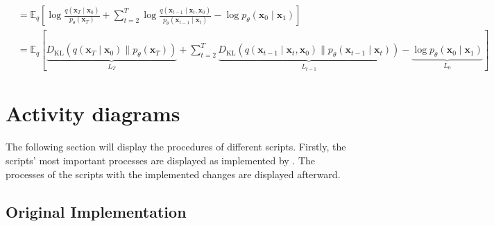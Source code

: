 \begin{subequations}
\begin{align}
	& =\mathbb{E}_q\left[\log \frac{q\left(\mathbf{x}_T \mid \mathbf{x}_0\right)}{p_\theta\left(\mathbf{x}_T\right)}+\sum_{t=2}^T \log \frac{q\left(\mathbf{x}_{t-1} \mid \mathbf{x}_t, \mathbf{x}_0\right)}{p_\theta\left(\mathbf{x}_{t-1} \mid \mathbf{x}_t\right)}-\log p_\theta\left(\mathbf{x}_0 \mid \mathbf{x}_1\right)\right] \\
	& =\mathbb{E}_q[\underbrace{D_{\mathrm{KL}}\left(q\left(\mathbf{x}_T \mid \mathbf{x}_0\right) \| p_\theta\left(\mathbf{x}_T\right)\right)}_{L_T}+\sum_{t=2}^T \underbrace{D_{\mathrm{KL}}\left(q\left(\mathbf{x}_{t-1} \mid \mathbf{x}_t, \mathbf{x}_0\right) \| p_\theta\left(\mathbf{x}_{t-1} \mid \mathbf{x}_t\right)\right)}_{L_{t-1}}-\underbrace{\log p_\theta\left(\mathbf{x}_0 \mid \mathbf{x}_1\right)}_{L_0}]
	\end{align}
\end{subequations}
\endgroup

\newpage


\section{Activity diagrams}
\label{A:activity_diagrams}

The following section will display the procedures of different scripts.
Firstly, the scripts' most important processes are displayed as implemented by \cite{kotelnikov2022TabDDPMModellingTabular}. 
The processes of the scripts with the implemented changes are displayed afterward.

\subsection[]{Original Implementation}
\label{A:Original_implementation}

